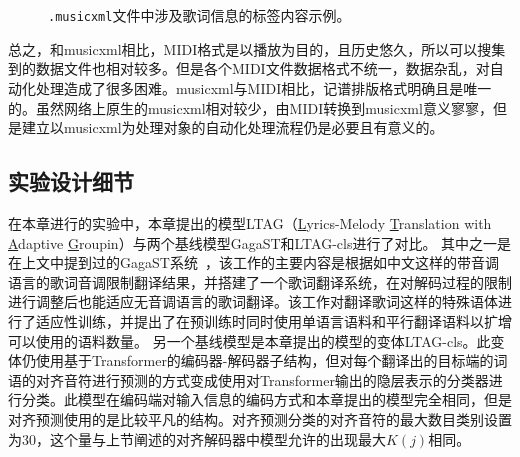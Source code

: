 \begin{figure}[ht]
    \centering
    \\
    \\
    \caption{\texttt{.musicxml}文件中涉及歌词信息的标签内容示例。}
\end{figure}
总之，和musicxml相比，MIDI格式是以播放为目的，且历史悠久，所以可以搜集到的数据文件也相对较多。但是各个MIDI文件数据格式不统一，数据杂乱，对自动化处理造成了很多困难。musicxml与MIDI相比，记谱排版格式明确且是唯一的。虽然网络上原生的musicxml相对较少，由MIDI转换到musicxml意义寥寥，但是建立以musicxml为处理对象的自动化处理流程仍是必要且有意义的。
\subsection{实验设计细节}
在本章进行的实验中，本章提出的模型LTAG（\underline{L}yrics-Melody \underline{T}ranslation with
\underline{A}daptive \underline{G}roupin）与两个基线模型GagaST和LTAG-cls进行了对比。
其中之一是在上文中提到过的GagaST系统~\cite{gagast}，该工作的主要内容是根据如中文这样的带音调语言的歌词音调限制翻译结果，并搭建了一个歌词翻译系统，在对解码过程的限制进行调整后也能适应无音调语言的歌词翻译。该工作对翻译歌词这样的特殊语体进行了适应性训练，并提出了在预训练时同时使用单语言语料和平行翻译语料以扩增可以使用的语料数量。
另一个基线模型是本章提出的模型的变体LTAG-cls。此变体仍使用基于Transformer的编码器-解码器子结构，但对每个翻译出的目标端的词语的对齐音符进行预测的方式变成使用对Transformer输出的隐层表示的分类器进行分类。此模型在编码端对输入信息的编码方式和本章提出的模型完全相同，但是对齐预测使用的是比较平凡的结构。对齐预测分类的对齐音符的最大数目类别设置为30，这个量与上节阐述的对齐解码器中模型允许的出现最大$K(j)$相同。

